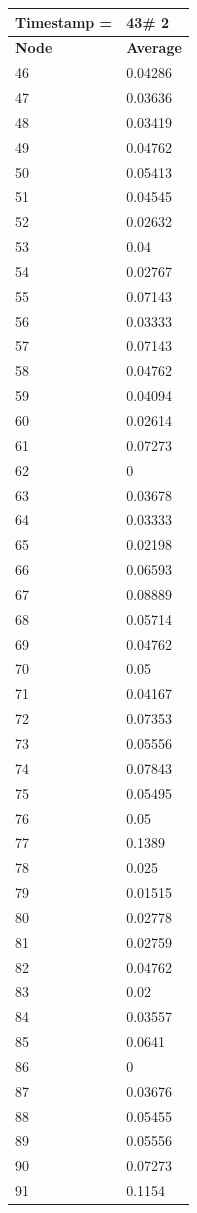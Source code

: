 \begin{tabular}{|l||l|}
\hline
\textbf{Timestamp =} & \textbf{43}\# 2\\\hline
	\textbf{Node} & \textbf{Average} \\ \hline
\hline
	46 & 0.04286 \\ \hline
	47 & 0.03636 \\ \hline
	48 & 0.03419 \\ \hline
	49 & 0.04762 \\ \hline
	50 & 0.05413 \\ \hline
	51 & 0.04545 \\ \hline
	52 & 0.02632 \\ \hline
	53 & 0.04 \\ \hline
	54 & 0.02767 \\ \hline
	55 & 0.07143 \\ \hline
	56 & 0.03333 \\ \hline
	57 & 0.07143 \\ \hline
	58 & 0.04762 \\ \hline
	59 & 0.04094 \\ \hline
	60 & 0.02614 \\ \hline
	61 & 0.07273 \\ \hline
	62 & 0 \\ \hline
	63 & 0.03678 \\ \hline
	64 & 0.03333 \\ \hline
	65 & 0.02198 \\ \hline
	66 & 0.06593 \\ \hline
	67 & 0.08889 \\ \hline
	68 & 0.05714 \\ \hline
	69 & 0.04762 \\ \hline
	70 & 0.05 \\ \hline
	71 & 0.04167 \\ \hline
	72 & 0.07353 \\ \hline
	73 & 0.05556 \\ \hline
	74 & 0.07843 \\ \hline
	75 & 0.05495 \\ \hline
	76 & 0.05 \\ \hline
	77 & 0.1389 \\ \hline
	78 & 0.025 \\ \hline
	79 & 0.01515 \\ \hline
	80 & 0.02778 \\ \hline
	81 & 0.02759 \\ \hline
	82 & 0.04762 \\ \hline
	83 & 0.02 \\ \hline
	84 & 0.03557 \\ \hline
	85 & 0.0641 \\ \hline
	86 & 0 \\ \hline
	87 & 0.03676 \\ \hline
	88 & 0.05455 \\ \hline
	89 & 0.05556 \\ \hline
	90 & 0.07273 \\ \hline
	91 & 0.1154 \\ \hline
\end{tabular}
